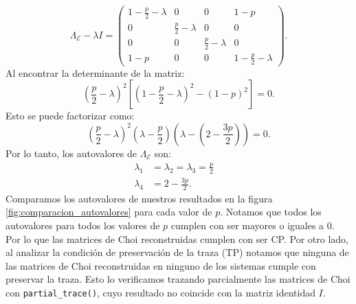 \documentclass[letterpaper,12pt]{thesisECFM}
\theoremstyle{plain}
\theoremstyle{definition}
\theoremstyle{remark}
\newcommand{\1}{\mathbb{1}}
\begin{document}
\begin{equation}
\Lambda_\mathcal{E} - \lambda I = \begin{pmatrix}
1 - \frac{p}{2} - \lambda & 0 & 0 & 1 - p \\
0 & \frac{p}{2} - \lambda & 0 & 0 \\
0 & 0 & \frac{p}{2} - \lambda & 0 \\
1 - p & 0 & 0 & 1 - \frac{p}{2} - \lambda
\end{pmatrix}.
\end{equation}
Al encontrar la determinante de la matriz:
\begin{equation}
\left( \frac{p}{2} - \lambda \right)^2  \left[ \left( 1 - \frac{p}{2} - \lambda \right)^2 - (1 - p)^2 \right] = 0.
\end{equation}
Esto se puede factorizar como:
\begin{equation}
\left( \frac{p}{2} - \lambda \right)^2 \left( \lambda - \frac{p}{2} \right) \left( \lambda - \left( 2 - \frac{3p}{2} \right) \right) = 0.
\end{equation}
Por lo tanto, los autovalores de $\Lambda_{\mathcal{E}}$ son:
\begin{align}
\lambda_1 &=\lambda_2=\lambda_3 = \frac{p}{2} \quad \\
\lambda_4 &= 2 - \frac{3p}{2} .
\end{align}
Comparamos los autovalores de nuestros resultados en la figura
\ref{fig:comparacion_autovalores} para cada valor de $p$. Notamos que todos los
autovalores para todos los valores de $p$ cumplen con ser mayores o iguales a
0. Por lo que las matrices de Choi reconstruidas cumplen con ser CP.  Por otro
lado, al analizar la condición de preservación de la traza (TP) notamos que
ninguna de las matrices de Choi reconstruidas en ninguno de los sistemas cumple
con preservar la traza. Esto lo verificamos trazando parcialmente las matrices
de Choi con \texttt{partial\_trace()}, cuyo resultado no coincide con la matriz
identidad $I$. 
\end{document}
